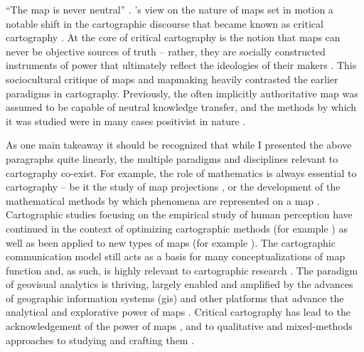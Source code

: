 \enquote{The map is never neutral} \parencite[p.~15]{har1989}.
\citeauthor{har1989}'s view on the nature of maps set in motion
a notable shift in the cartographic discourse
that became known as critical cartography \parencite{cra2018}.
At the core of critical cartography is the notion that
maps can never be objective sources of truth --
rather, they are socially constructed instruments of power
that ultimately reflect the ideologies of their makers \parencite{har1989}.
This sociocultural critique of maps and mapmaking
heavily contrasted the earlier paradigms in cartography.
Previously, the often implicitly authoritative map was
assumed to be capable of neutral knowledge transfer,
and the methods by which it was studied were in many cases positivist in nature
\parencite{cra2018, fai2021}.

As one main takeaway it should be recognized that
while I presented the above paragraphs quite linearly,
the multiple paradigms and disciplines relevant to cartography co-exist.
For example,
the role of mathematics is always essential to cartography --
be it the study of map projections \parencite{ker2018},
or the development of the mathematical methods
by which phenomena are represented on a map
\parencite{fra2000}.
Cartographic studies focusing on the empirical study of human perception
have continued in the context of optimizing cartographic methods (for example \parencite{yan2023})
as well as been applied to new types of maps (for example \textcite{col2009}).
The cartographic communication model still acts as a basis
for many conceptualizations of map function and, as such,
is highly relevant to cartographic research \parencite{ken2018}.
The paradigm of geovisual analytics is thriving,
largely enabled and amplified by the advances of geographic information systems (\acrshort{gis})
and other platforms that advance the analytical and explorative power of maps
\parencite{rot2013a, kra2017, lv2017}.
Critical cartography has lead to the acknowledgement of the power of maps
\parencite{cra2018, pic1995},
and to qualitative and mixed-methods approaches to studying and crafting them
\parencite{suc2000, cop2009}.


